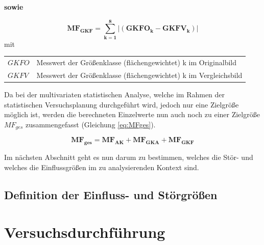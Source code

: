 \documentclass[
fontsize=10pt, 
listof = totoc,
parskip = half	
]{report}
\makeatletter
\newenvironment{conditions}
{\par\vspace{\abovedisplayskip}\noindent\begin{tabular}{>{$}l<{$} @{${}:{}$} l}}
	{\end{tabular}\par\vspace{\belowdisplayskip}}
\makeatother
\begin{document}
\noindent \textbf{sowie}

\begin{equation}\label{eq:MFGKf}
	\boxed{\mathbf{MF_{GKF} = \sum_{k=1}^{8} |\left(GKFO_k - GKFV_k\right)|}}
\end{equation}
mit
\begin{conditions}
	GKFO	&	Messwert der Größenklasse (flächengewichtet) k im Originalbild\\
	GKFV	&	Messwert der Größenklasse (flächengewichtet) k im  Vergleichsbild
\end{conditions}

\noindent Da bei der multivariaten statistischen Analyse, welche im Rahmen der statistischen Versuchsplanung durchgeführt wird, jedoch nur eine Zielgröße möglich ist, werden die berechneten Einzelwerte nun auch noch zu einer Zielgröße $MF_{ges}$ zusammengefasst (Gleichung \ref{eq:MFges}).

\begin{equation}\label{eq:MFges}
	\boxed{\mathbf{MF_{ges} = MF_{AK} + MF_{GKA} + MF_{GKF}}}
\end{equation}

\noindent Im nächsten Abschnitt geht es nun darum zu bestimmen, welches die Stör- und welches die Einflussgrößen im zu analysierenden Kontext sind.

\subsection{Definition der Einfluss- und Störgrößen}


\section{Versuchsdurchführung}
\end{document}
